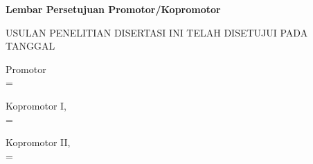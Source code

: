
\newpage

\newcommand{\smartsignature}[2]{%
    \setbox0=\hbox{#1}%
    \ifdim\wd0>0.47\textwidth
        {\small #1\\[0.3em]#2}%
    \else
        {#1\\[0.3em]#2}%
    \fi
}

\begin{center}
    \begin{onehalfspace}
        \textbf{\large Lembar Persetujuan Promotor/Kopromotor}
    \end{onehalfspace}
\end{center}

\begin{center}
    \begin{onehalfspace}
        \large \MakeUppercase {USULAN PENELITIAN DISERTASI INI TELAH DISETUJUI PADA TANGGAL \tglpersetujuan}
    \end{onehalfspace}
\end{center}

\begin{center}
	\begin{minipage}[t]{0.47\textwidth}
		\centering
		
		Promotor \\[2.5cm]
		
		\smartsignature{\promotor}{NIP. \NIPpromotor}
	\end{minipage}    
\end{center}

\vspace{0.75cm}
\noindent\begin{minipage}[t]{0.47\textwidth}
    \raggedright
    Kopromotor I,\\[2.5cm]
    
    \smartsignature{\kopromotorI}{NIP. \NIPkopromotorI}
\end{minipage}%
\hfill%
\begin{minipage}[t]{0.47\textwidth}
    \raggedright
    Kopromotor II,\\[2.5cm]
    
    \smartsignature{\kopromotorII}{NIP. \NIPkopromotorII}
\end{minipage}%

